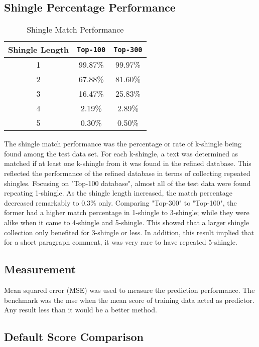 \subsection{Shingle Percentage Performance}

\begin{table}
\caption{Shingle Match Performance}
		\begin{tabular}{ccc}
			\toprule
				Shingle Length & \texttt{Top-100} & \texttt{Top-300} \\
			\midrule
				1 & 99.87\% & 99.97\% \\
				2 & 67.88\% & 81.60\% \\
				3 & 16.47\% & 25.83\% \\
				4 & 2.19\%  & 2.89\% \\
				5 & 0.30\%  & 0.50\% \\
			\bottomrule
		\end{tabular}
\end{table}

The shingle match performance was the percentage or rate of k-shingle being found among the test data set. 
For each k-shingle, a text was determined as matched if at least one k-shingle from it was found in the refined database. 
This reflected the performance of the refined database in terms of collecting repeated shingles. 
Focusing on "Top-100 database", almost all of the test data were found repeating 1-shingle. As the shingle length increased, the match percentage decreased remarkably to 0.3\% only. 
Comparing "Top-300" to "Top-100", the former had a higher match percentage in 1-shingle to 3-shingle; while they were alike when it came to 4-shingle and 5-shingle.
This showed that a larger shingle collection only benefited for 3-shingle or less. In addition, this result implied that for a short paragraph comment, it was very rare to have repeated 5-shingle. 

\subsection{Measurement}
Mean squared error (MSE) was used to measure the prediction performance. The benchmark was the mse when the mean score of training data acted as predictor. Any result less than it would be a better method.

\subsection{Default Score Comparison}

